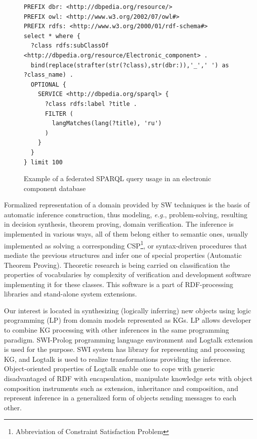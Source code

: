 \documentclass[
]{ceurart}
\begin{document}
\begin{figure}[bth]
  \centering
\begin{verbatim}
PREFIX dbr: <http://dbpedia.org/resource/>
PREFIX owl: <http://www.w3.org/2002/07/owl#>
PREFIX rdfs: <http://www.w3.org/2000/01/rdf-schema#>
select * where {
  ?class rdfs:subClassOf <http://dbpedia.org/resource/Electronic_component> .
  bind(replace(strafter(str(?class),str(dbr:)),'_',' ') as ?class_name) .
  OPTIONAL {
    SERVICE <http://dbpedia.org/sparql> {
      ?class rdfs:label ?title .
      FILTER (
        langMatches(lang(?title), 'ru')
      )
    }
  }
} limit 100
\end{verbatim}
  \caption{Example of a federated SPARQL query usage in an electronic component database}
  \label{fig:sparql-ex1}
\end{figure}

Formalized representation of a domain provided by SW techniques is the basis of automatic inference construction, thus modeling, \emph{e.g.}, problem-solving, resulting in decision synthesis, theorem proving, domain verification.  The inference is implemented in various ways, all of them belong either to semantic ones, usually implemented as solving a corresponding CSP\footnote{Abbreviation of Constraint Satisfaction Problem}, or syntax-driven procedures that mediate the previous structures and infer one of special properties (Automatic Theorem Proving).  Theoretic research is being carried on classification the properties of vocabularies by complexity of verification and development software implementing it for these classes.  This software is a  part of RDF-processing libraries and stand-alone system extensions.

Our interest is located in synthesizing (logically inferring) new objects using logic programming (LP) from domain models represented as KGs.  LP allows developer to combine KG processing with other inferences in the same programming paradigm.  SWI-Prolog programming language environment and Logtalk extension is used for the purpose.  SWI system has library for representing and processing KG, and Logtalk is used to realize transformations providing the inference.  Object-oriented properties of Logtalk enable one to cope with generic disadvantaged of RDF with encapsulation, manipulate knowledge sets with object composition instruments such as extension, inheritance and composition, and represent inference in a generalized form of objects sending messages to each other.
\end{document}

